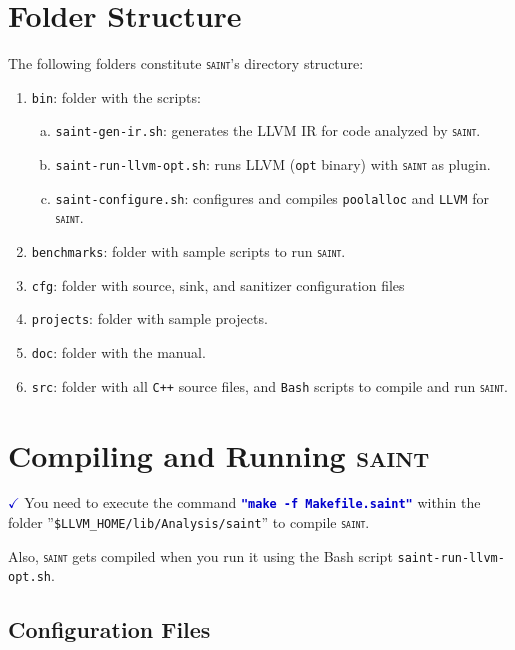 \documentclass[12pt,onecolumn,a4paper]{article}
\newcommand{\saint}{\texttt{\textsc{saint}}\xspace}
\newcommand{\tool}[1]{\texttt{#1}\xspace}
\newcommand{\command}[1]{\textcolor{mediumblue}{\texttt{\textbf{"#1"}}}\xspace}
\newcommand{\script}[1]{\texttt{#1}\xspace}
\newcommand{\mycheckmark}[1]{\textcolor{#1}{$\checkmark$}}
\begin{document}
\section{Folder Structure}
The following folders constitute \saint's directory structure:
\begin{enumerate}[1)]
	\item \texttt{bin}: folder with the scripts:
	\begin{enumerate}[a)]
		\item \script{saint-gen-ir.sh}: generates the LLVM IR for code analyzed by \saint.
		\item \script{saint-run-llvm-opt.sh}: runs LLVM (\texttt{opt} binary) with \saint as plugin.
		\item \script{saint-configure.sh}: configures and compiles \tool{poolalloc}
		      and \tool{LLVM} for \saint.
	\end{enumerate}
	
	\item \texttt{benchmarks}: folder with sample
	scripts to run \saint.

	\item \texttt{cfg}: folder with source, sink, and sanitizer configuration files
		
	\item \texttt{projects}: folder with sample projects.	

	\item \texttt{doc}: folder with the manual.
	
	\item \texttt{src}: folder with all \texttt{C++} source files,
	and \tool{Bash} scripts to compile and run \saint.			
\end{enumerate}

\section{Compiling and Running \textsc{saint}}

\mycheckmark{mediumblue} You need to execute the command
\command{make -f Makefile.saint} within the
folder ''\texttt{\$LLVM\_HOME/lib/Analysis/saint}'' to compile
\saint.

Also, \saint gets compiled when you run it using
the Bash script \script{saint-run-llvm-opt.sh}.

\subsection{Configuration Files}
\end{document}
